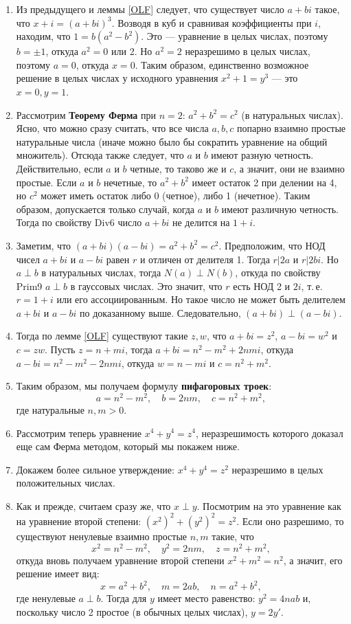\begin{enumerate}
\item Из предыдущего и леммы \ref{OLF} следует, что существует число $a+bi$ такое, что $x+i=(a+bi)^3$. Возводя в куб и сравнивая коэффициенты при $i$, находим, что $1=b(a^2-b^2)$. Это --- уравнение в целых числах, поэтому $b=\pm 1$, откуда $a^2=0$ или 2. Но $a^2=2$ неразрешимо в целых числах, поэтому $a=0$, откуда $x=0$. Таким образом, единственно возможное решение в целых числах у исходного уравнения $x^2+1=y^3$ --- это $x=0, y=1$.

\item Рассмотрим \textbf{Теорему Ферма} при $n=2$: $a^2+b^2=c^2$ (в натуральных числах). Ясно, что можно сразу считать, что все числа $a,b,c$ попарно взаимно простые натуральные числа (иначе можно было бы сократить уравнение на общий множитель). Отсюда также следует, что $a$ и $b$ имеют разную четность. Действительно, если $a$ и $b$ четные, то таково же и $c$, а значит, они не взаимно простые. Если $a$ и $b$ нечетные, то $a^2+b^2$ имеет остаток 2 при делении на 4, но $c^2$ может иметь остаток либо 0 (четное), либо 1 (нечетное). Таким образом, допускается только случай, когда $a$ и $b$ имеют различную четность. Тогда по свойству Div6 число $a+bi$ не делится на $1+i$.

\item Заметим, что $(a+bi)(a-bi)=a^2+b^2=c^2$. Предположим, что НОД чисел $a+bi$ и $a-bi$ равен $r$ и отличен от делителя 1. Тогда $r|2a$ и $r|2bi$. Но $a\perp b$ в натуральных числах, тогда $N(a)\perp N(b)$, откуда по свойству Prim9 $a\perp b$ в гауссовых числах. Это значит, что $r$ есть НОД 2 и $2i$, т.\,е. $r=1+i$ или его ассоциированным. Но такое число не может быть делителем $a+bi$ и $a-bi$ по доказанному выше. Следовательно, $(a+bi)\perp (a-bi)$.

\item Тогда по лемме \ref{OLF} существуют такие $z,w$, что $a+bi=z^2$, $a-bi=w^2$ и $c=zw$. Пусть $z=n+mi$, тогда $a+bi=n^2-m^2+2nmi$, откуда $a-bi=n^2-m^2-2nmi$, откуда $w=n-mi$ и $c=n^2+m^2$.

\item Таким образом, мы получаем формулу \textbf{пифагоровых троек}:
$$
a=n^2-m^2,\quad b=2nm,\quad c=n^2+m^2,
$$
где натуральные $n,m>0$.

\item Рассмотрим теперь уравнение $x^4+y^4=z^4$, неразрешимость которого доказал еще сам Ферма методом, который мы покажем ниже. 

\item Докажем более сильное утверждение: $x^4+y^4=z^2$ неразрешимо в целых положительных числах.
\item Как и прежде, считаем сразу же, что $x\perp y$. Посмотрим на это уравнение как на уравнение второй степени: $(x^2)^2+(y^2)^2=z^2$. Если оно разрешимо, то существуют ненулевые взаимно простые $n,m$ такие, что
$$
x^2=n^2-m^2,\quad y^2=2nm,\quad z=n^2+m^2,
$$
откуда вновь получаем уравнение второй степени $x^2+m^2=n^2$, а значит, его решение имеет вид:
$$
x=a^2+b^2,\quad m=2ab,\quad n=a^2+b^2,
$$
где ненулевые $a\perp b$. Тогда для $y$ имеет место равенство: $y^2=4nab$ и, поскольку число 2 простое (в обычных целых числах), $y=2y'$.


\end{enumerate}
